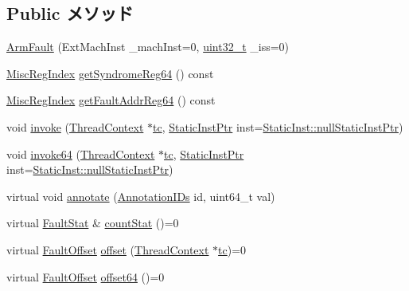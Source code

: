 \subsection*{Public メソッド}
\begin{DoxyCompactItemize}
\item 
\hyperlink{classArmISA_1_1ArmFault_a0b41a5f87b01c7e5df6f1b05d86d506e}{ArmFault} (ExtMachInst \_\-machInst=0, \hyperlink{Type_8hh_a435d1572bf3f880d55459d9805097f62}{uint32\_\-t} \_\-iss=0)
\item 
\hyperlink{namespaceArmISA_a1e522017e015d4c7efd6b2360143aa67}{MiscRegIndex} \hyperlink{classArmISA_1_1ArmFault_afe3b3e62aed4e08eb41a2b458fa78b5f}{getSyndromeReg64} () const 
\item 
\hyperlink{namespaceArmISA_a1e522017e015d4c7efd6b2360143aa67}{MiscRegIndex} \hyperlink{classArmISA_1_1ArmFault_a2d53b5dbdfef7129f082792e84b2a732}{getFaultAddrReg64} () const 
\item 
void \hyperlink{classArmISA_1_1ArmFault_a2bd783b42262278d41157d428e1f8d6f}{invoke} (\hyperlink{classThreadContext}{ThreadContext} $\ast$\hyperlink{namespaceArmISA_a5aff829af55e65b802d83dfcef4e9dd0}{tc}, \hyperlink{classRefCountingPtr}{StaticInstPtr} inst=\hyperlink{classStaticInst_aa793d9793af735f09096369fb17567b6}{StaticInst::nullStaticInstPtr})
\item 
void \hyperlink{classArmISA_1_1ArmFault_aaf4d069b2d2cce997ddb00514554ac02}{invoke64} (\hyperlink{classThreadContext}{ThreadContext} $\ast$\hyperlink{namespaceArmISA_a5aff829af55e65b802d83dfcef4e9dd0}{tc}, \hyperlink{classRefCountingPtr}{StaticInstPtr} inst=\hyperlink{classStaticInst_aa793d9793af735f09096369fb17567b6}{StaticInst::nullStaticInstPtr})
\item 
virtual void \hyperlink{classArmISA_1_1ArmFault_a1711e0fd9d5fa3eaa8e62cc821ef850d}{annotate} (\hyperlink{classArmISA_1_1ArmFault_a955305710181a260a9ee0b419a6027fb}{AnnotationIDs} id, uint64\_\-t val)
\item 
virtual \hyperlink{classStats_1_1Scalar}{FaultStat} \& \hyperlink{classArmISA_1_1ArmFault_a5d92ccd11b5cd6b04f02bd0a088b776c}{countStat} ()=0
\item 
virtual \hyperlink{classm5_1_1params_1_1Addr}{FaultOffset} \hyperlink{classArmISA_1_1ArmFault_abd70b2c2ab6d989305cd72d37594cf70}{offset} (\hyperlink{classThreadContext}{ThreadContext} $\ast$\hyperlink{namespaceArmISA_a5aff829af55e65b802d83dfcef4e9dd0}{tc})=0
\item 
virtual \hyperlink{classm5_1_1params_1_1Addr}{FaultOffset} \hyperlink{classArmISA_1_1ArmFault_aa7f9ab8b5a2e4da88efdfcb60c8d2574}{offset64} ()=0

\end{DoxyCompactItemize}
